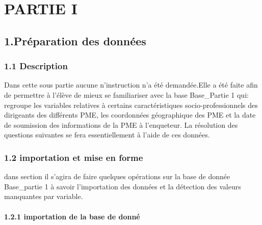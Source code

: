 \documentclass[
]{article}
\author{}
\date{\vspace{-2.5em}}
\begin{document}


\thispagestyle{empty}
\newpage

\setcounter{tocdepth}{4}                
\renewcommand{\contentsname}{\textcolor{blue}{Sommaire}}

\textcolor{blue}{\tableofcontents} \newpage

\hypertarget{partie-i}{%
\section{PARTIE I}\label{partie-i}}

\hypertarget{pruxe9paration-des-donnuxe9es}{%
\subsection{1.Préparation des
données}\label{pruxe9paration-des-donnuxe9es}}

\hypertarget{description}{%
\subsubsection{1.1 Description}\label{description}}

Dans cette sous partie aucune n'instruction n'a été demandée.Elle a été
faite afin de permettre à l'élève de mieux se familiariser avec la base
Base\_Partie 1 qui: regroupe les variables relatives à certains
caractéristiques socio-professionnels des dirigeants des différents PME,
les coordonnées géographique des PME et la date de soumission des
informations de la PME à l'enqueteur. La résolution des questions
suivantes se fera essentiellement à l'aide de ces données.

\hypertarget{importation-et-mise-en-forme}{%
\subsubsection{1.2 importation et mise en
forme}\label{importation-et-mise-en-forme}}

dans section il s'agira de faire quelques opérations sur la base de
donnée Base\_partie 1 à savoir l'importation des données et la détection
des valeurs manquantes par variable.

\hypertarget{importation-de-la-base-de-donnuxe9}{%
\paragraph{1.2.1 importation de la base de
donné}\label{importation-de-la-base-de-donnuxe9}}
\end{document}
